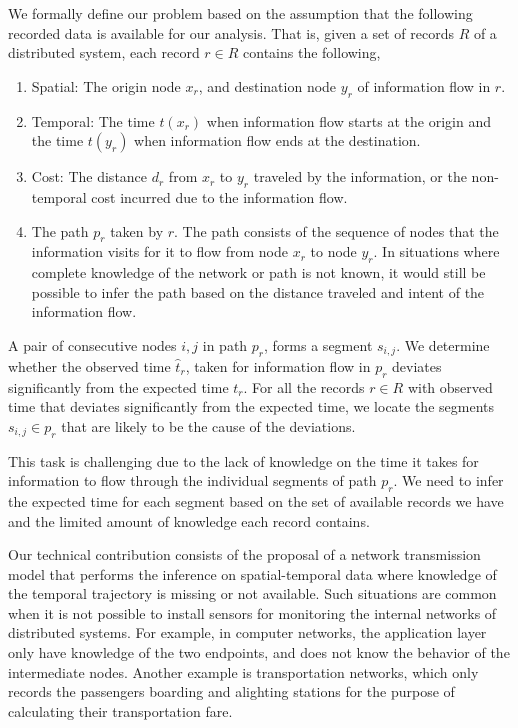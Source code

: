 \documentclass[conference]{IEEEtran.1.8}
\begin{document}
We formally define our problem based on the assumption that the following recorded data is available for our analysis. That is, given a set of records $R$ of a distributed system, each record $r \in R$ contains the following,
\begin{enumerate}
	\item Spatial: The origin node $x_r$, and destination node $y_r$ of information flow in $r$.
	\item Temporal: The time $t(x_r)$ when information flow starts at the origin and the time $t(y_r)$ when information flow ends at the destination.
	\item Cost: The distance $d_r$ from $x_r$ to $y_r$ traveled by the information, or the non-temporal cost incurred due to the information flow.
	\item The path $p_r$ taken by $r$. The path consists of the sequence of nodes that the information visits for it to flow from node $x_r$ to node $y_r$. In situations where complete knowledge of the network or path is not known, it would still be possible to infer the path based on the distance traveled and intent of the information flow.
\end{enumerate}
A pair of consecutive nodes $i,j$ in path $p_r$, forms a segment $s_{i,j}$. We determine whether the observed time $\hat{t}_r$, taken for information flow in $p_r$ deviates significantly from the expected time $t_r$. For all the records $r \in R$ with observed time that deviates significantly from the expected time, we locate the segments $s_{i,j} \in p_r$ that are likely to be the cause of the deviations. 

This task is challenging due to the lack of knowledge on the time it takes for information to flow through the individual segments of path $p_r$. We need to infer the expected time for each segment based on the set of available records we have and the limited amount of knowledge each record contains.

Our technical contribution consists of the proposal of a network transmission model that performs the inference on spatial-temporal data where knowledge of the temporal trajectory is missing or not available. Such situations are common when it is not possible to install sensors for monitoring the internal networks of distributed systems. For example, in computer networks, the application layer only have knowledge of the two endpoints, and does not know the behavior of the intermediate nodes. Another example is transportation networks, which only records the passengers boarding and alighting stations for the purpose of calculating their transportation fare. 
\end{document}
